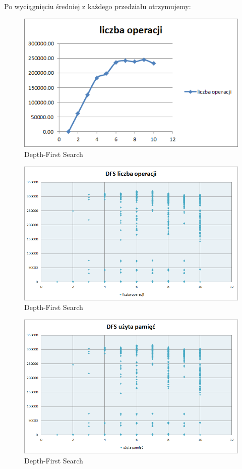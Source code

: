 \documentclass{classrep}
\begin{document}
Po wyciągnięciu średniej z każdego przedziału otrzymujemy:

\begin{figure}[ht]
\centering
			\includegraphics[scale=0.65]{pictures/old/dfs_operacje.png}
	\caption{Depth-First Search}
	\label{fig:Depth-First Search}
\end{figure}

\clearpage

\begin{figure}[ht]
\centering
			\includegraphics[scale=0.65]{pictures/DFS_operacje_exp.png}
	\caption{Depth-First Search}
	\label{fig:Depth-First Search}
\end{figure}

\begin{figure}[ht]
\centering
			\includegraphics[scale=0.65]{pictures/DFS_pamiec_exp.png}
	\caption{Depth-First Search}
	\label{fig:Depth-First Search}
\end{figure}
\end{document}
